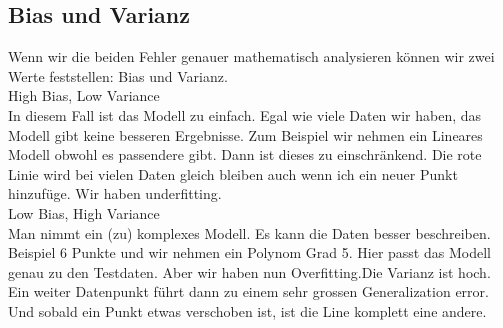 \subsection{Bias und Varianz}
Wenn wir die beiden Fehler genauer mathematisch analysieren können wir zwei Werte feststellen: Bias und Varianz.\\
\textcolor{myblue}{High Bias, Low Variance}\\
In diesem Fall ist das Modell zu einfach. Egal wie viele Daten wir haben, das Modell gibt keine besseren Ergebnisse. Zum Beispiel wir nehmen ein Lineares Modell obwohl es passendere gibt. Dann ist dieses zu einschränkend. Die rote Linie wird bei vielen Daten gleich bleiben auch wenn ich ein neuer Punkt hinzufüge. Wir haben underfitting.\\
\textcolor{myblue}{Low Bias, High Variance}\\
Man nimmt ein (zu) komplexes Modell. Es kann die Daten besser beschreiben. Beispiel 6 Punkte und wir nehmen ein Polynom Grad 5. Hier passt das Modell genau zu den Testdaten. Aber wir haben nun Overfitting.Die Varianz ist hoch. Ein weiter Datenpunkt führt dann zu einem sehr grossen Generalization error. Und sobald ein Punkt etwas verschoben ist, ist die Line komplett eine andere.
